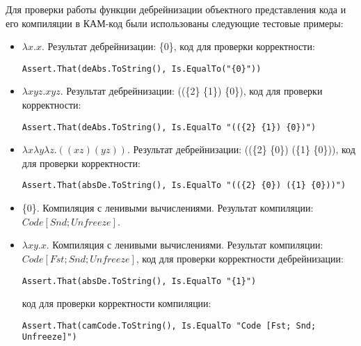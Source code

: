 Для проверки работы функции дебрейнизации объектного представления кода и его компиляции в КАМ-код были использованы следующие тестовые примеры:
\begin{itemize}
	\item $\lambda x.x$. Результат дебрейнизации: \{0\}, код для проверки корректности:
	
	\verb|Assert.That(deAbs.ToString(), Is.EqualTo("{0}"))|
	\item $\lambda xyz.xyz$. Результат дебрейнизации: ((\{2\} \{1\}) \{0\}), код для проверки корректности:
	
	\verb|Assert.That(deAbs.ToString(), Is.EqualTo "(({2} {1}) {0})")|
	\item $\lambda x \lambda y \lambda z.((xz)(yz))$. Результат дебрейнизации: ((\{2\} \{0\}) (\{1\} \{0\})), код для проверки корректности:
	
	\verb|Assert.That(absDe.ToString(), Is.EqualTo "(({2} {0}) ({1} {0}))")|
	
	\item \{0\}. Компиляция с ленивыми вычислениями. Результат компиляции: $Code [Snd; Unfreeze]$.
	
	\item $\lambda xy.x$. Компиляция с ленивыми вычислениями. Результат компиляции: $Code [Fst; Snd; Unfreeze]$, код для проверки корректности дебрейнизации:
	
	\verb|Assert.That(absDe.ToString(), Is.EqualTo "{1}")|
	
	код для проверки корректности компиляции:
	
	\verb|Assert.That(camCode.ToString(), Is.EqualTo "Code [Fst; Snd; Unfreeze]")|
\end{itemize}





